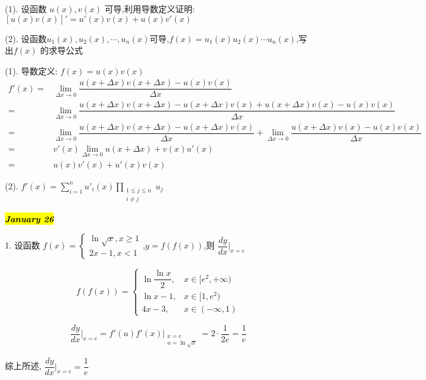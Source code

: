 (1). 设函数 $u(x),v(x)$ 可导,利用导数定义证明:$[u(x)v(x)]'=u'(x)v(x)+u(x)v'(x)$

(2). 设函数$u_{1}(x),u_{2}(x),\cdots,u_{n}(x)$可导,$f(x)=u_{1}(x)u_{2}(x)\cdots u_{n}(x)$,写出$f(x)$ 的求导公式
\begin{solution}

	(1). 导数定义: $f(x) = u(x)v(x)$
	\begin{align*}
		f'(x) = & \lim\limits_{\Delta x\to 0}\dfrac{u(x+\Delta x)v(x+\Delta x)-u(x)v(x)}{\Delta x}\\
		  	  = & \lim\limits_{\Delta x\to 0}\dfrac{u(x+\Delta x)v(x+\Delta x)-u(x+\Delta x)v(x)+u(x+\Delta x)v(x)-u(x)v(x)}{\Delta x}\\
		      = & \lim\limits_{\Delta x\to 0}\dfrac{u(x+\Delta x)v(x+\Delta x)-u(x+\Delta x)v(x)}{\Delta x}+\lim\limits_{\Delta x\to 0}\dfrac{u(x+\Delta x)v(x)-u(x)v(x)}{\Delta x}\\
		      = & v'(x)\lim\limits_{\Delta x\to 0} u(x+\Delta x)+v(x)u'(x)\\
			  = & u(x)v'(x)+u'(x)v(x)
	\end{align*}

	(2). $f'(x) = \sum\limits_{i=1}^{n}u'_{i}(x)\prod\limits_{\substack{1\leq j\leq n\\ i\neq j }}u_{j}$
\end{solution}

\hl{\textbf{\textit{January 26}}}

1. 设函数 $f(x)=\begin{cases}
	\ln\sqrt{x},x\geq 1\\2x-1,x<1
\end{cases}$,$y=f(f(x))$,则 $\dfrac{dy}{dx}\big|_{x=e}$
\begin{solution}
\begin{anymark}[方法一]
	$$f(f(x)) = 
	\begin{cases}
		\ln\dfrac{\ln x}{2}, & x\in[e^{2},+\infty)\\
		\ln x -1, & x\in [1,e^{2})\\
		4x-3, & x\in(-\infty,1)
	\end{cases}$$
\end{anymark}
	
\begin{anymark}[方法二]
	$$\dfrac{dy}{dx}\big|_{x=e} = f'(u)f'(x)\big|_{\substack{x = e\\u = \ln\sqrt{x}}}=2\cdot \dfrac{1}{2e} =\dfrac{1}{e}$$
\end{anymark}
	综上所述, $\dfrac{dy}{dx}\big|_{x=e} = \dfrac{1}{e}$
\end{solution}

